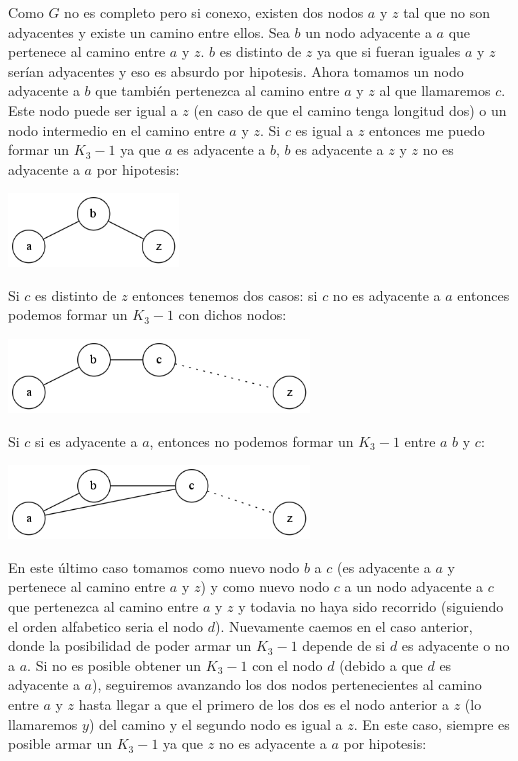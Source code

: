 \documentclass[a4paper,11pt] {article}
\begin{document}
\begin{itemize}
Como $G$ no es completo pero si conexo, existen dos nodos $a$ y $z$ tal que no son adyacentes y existe un camino entre ellos. Sea $b$ un nodo adyacente a $a$ que pertenece al camino entre $a$ y $z$. $b$ es distinto de $z$ ya que si fueran iguales $a$ y $z$ ser\'ian adyacentes y eso es absurdo por hipotesis. Ahora tomamos un nodo adyacente a $b$ que tambi\'en pertenezca al camino entre $a$ y $z$ al que llamaremos $c$. Este nodo puede ser igual a $z$ (en caso de que el camino tenga longitud dos) o un nodo intermedio en el camino entre $a$ y $z$. Si $c$ es igual a $z$ entonces me puedo formar un $K_{3}-1$ ya que $a$ es adyacente a $b$, $b$ es adyacente a $z$ y $z$ no es adyacente a $a$ por hipotesis:
\begin{center}
 \includegraphics[width=0.34\textwidth]{Grafos/ej2figura1-1.png}
\end{center}
Si $c$ es distinto de $z$ entonces tenemos dos casos: si $c$ no es adyacente a $a$ entonces podemos formar un $K_{3}-1$ con dichos nodos:
\begin{center}
 \includegraphics[width=0.6\textwidth]{Grafos/ej2figura1-2.png}
\end{center}
Si $c$ si es adyacente a $a$, entonces no podemos formar un $K_{3}-1$ entre $a$ $b$ y $c$:
\begin{center}
 \includegraphics[width=0.6\textwidth]{Grafos/ej2figura1-3.png}
\end{center}
En este \'ultimo caso tomamos como nuevo nodo $b$ a $c$ (es adyacente a $a$ y pertenece al camino entre $a$ y $z$) y como nuevo nodo $c$ a un nodo adyacente a $c$ que pertenezca al camino entre $a$ y $z$ y todavia no haya sido recorrido (siguiendo el orden alfabetico seria el nodo $d$). Nuevamente caemos en el caso anterior, donde la posibilidad de poder armar un $K_{3}-1$ depende de si $d$ es adyacente o no a $a$. Si no es posible obtener un $K_{3}-1$ con el nodo $d$ (debido a que $d$ es adyacente a $a$), seguiremos avanzando los dos nodos pertenecientes al camino entre $a$ y $z$ hasta llegar a que el primero de los dos es el nodo anterior a $z$ (lo llamaremos $y$) del camino y el segundo nodo es igual a $z$. En este caso, siempre es posible armar un $K_{3}-1$ ya que $z$ no es adyacente a $a$ por hipotesis:

\end{itemize}
\end{document}
